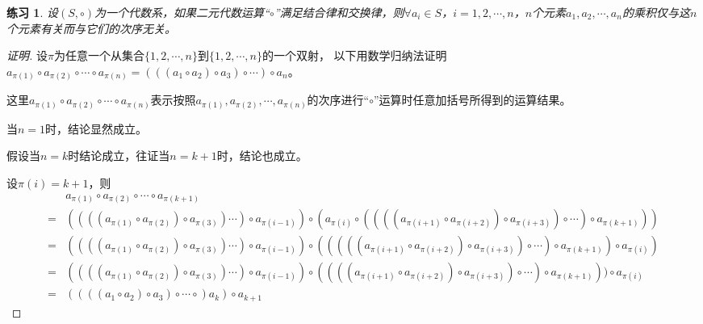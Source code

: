 \documentclass{article}
\newtheorem{Exercise}{练习}
\begin{document}
\begin{CJK*}{UTF8}{gbsn}
  \begin{Exercise}
    设$(S,\circ)$为一个代数系，如果二元代数运算“$\circ$”满足结合律和交换律，则$\forall a_i\in S$，$i=1,2,\cdots,n$，$n$个元素$a_1,a_2,\cdots,a_n$的乘积仅与这$n$个元素有关而与它们的次序无关。
  \end{Exercise}

\begin{proof}[证明]
    设$\pi$为任意一个从集合$\{1,2,\cdots,n\}$到$\{1,2,\cdots,n\}$的一个双射，
    以下用数学归纳法证明$a_{\pi(1)}\circ a_{\pi(2)}\circ \cdots \circ a_{\pi(n)}=(((a_1\circ a_2)\circ a_3)\circ \cdots )\circ a_n$。

    这里$a_{\pi(1)}\circ a_{\pi(2)}\circ \cdots \circ a_{\pi(n)}$表示按照$a_{\pi(1)},a_{\pi(2)}, \cdots, a_{\pi(n)}$的次序进行“$\circ$”运算时任意加括号所得到的运算结果。

    当$n=1$时，结论显然成立。

    假设当$n=k$时结论成立，往证当$n=k+1$时，结论也成立。

    设$\pi(i)=k+1$，则
    \begin{align*}
        &a_{\pi(1)}\circ a_{\pi(2)}\circ \cdots \circ a_{\pi(k+1)}\\
        =&((((a_{\pi(1)}\circ a_{\pi(2)})\circ a_{\pi(3)}) \cdots )\circ a_{\pi(i-1)})\circ (a_{\pi(i)} \circ ((((a_{\pi(i+1)}\circ a_{\pi(i+2)})\circ a_{\pi(i+3)})\circ \cdots )\circ a_{\pi(k+1)}))\\
        =&((((a_{\pi(1)}\circ a_{\pi(2)})\circ a_{\pi(3)}) \cdots )\circ a_{\pi(i-1)})\circ (((((a_{\pi(i+1)}\circ a_{\pi(i+2)})\circ a_{\pi(i+3)})\circ \cdots )\circ a_{\pi(k+1)})\circ a_{\pi(i)} )\\
        =&((((a_{\pi(1)}\circ a_{\pi(2)})\circ a_{\pi(3)}) \cdots )\circ a_{\pi(i-1)})\circ ((((a_{\pi(i+1)}\circ a_{\pi(i+2)})\circ a_{\pi(i+3)})\circ \cdots )\circ a_{\pi(k+1)}))\circ a_{\pi(i)}\\
        =&((((a_1\circ a_2)\circ a_3)\circ \cdots \circ) a_{k})\circ a_{k+1}
    \end{align*}
\end{proof}
\end{CJK*}
\end{document}
